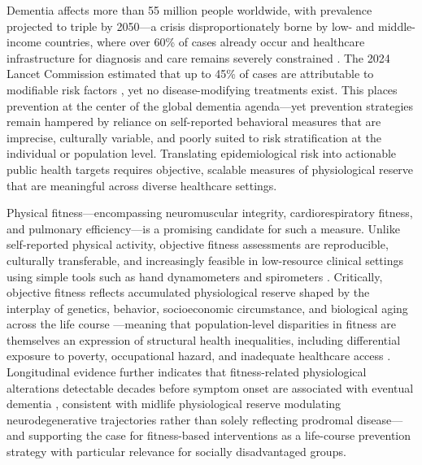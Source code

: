 \documentclass{article}
\begin{document}


Dementia affects more than 55 million people worldwide, with prevalence projected 
to triple by 2050—a crisis disproportionately borne by low- and middle-income 
countries, where over 60\% of cases already occur and healthcare infrastructure 
for diagnosis and care remains severely constrained \citep{world2021global, 
prince2015world}. The 2024 Lancet Commission estimated that up to 45\% of cases 
are attributable to modifiable risk factors \citep{livingston2024dementia}, yet no 
disease-modifying treatments exist. This places prevention at the center of the 
global dementia agenda—yet prevention strategies remain hampered by reliance on 
self-reported behavioral measures that are imprecise, culturally variable, and 
poorly suited to risk stratification at the individual or population level. 
Translating epidemiological risk into actionable public health targets requires 
objective, scalable measures of physiological reserve that are meaningful across 
diverse healthcare settings.


Physical fitness—encompassing neuromuscular integrity, cardiorespiratory fitness, 
and pulmonary efficiency—is a promising candidate for such a measure. Unlike 
self-reported physical activity, objective fitness assessments are reproducible, 
culturally transferable, and increasingly feasible in low-resource clinical 
settings using simple tools such as hand dynamometers and spirometers 
\citep{bohannon2019grip}. Critically, objective fitness 
reflects accumulated physiological reserve shaped by the interplay of genetics, 
behavior, socioeconomic circumstance, and biological aging across the life 
course \citep{edwards2018systemic, mcgreevy2023dnamfitage}—meaning that 
population-level disparities in fitness are themselves an expression of structural 
health inequalities, including differential exposure to poverty, occupational 
hazard, and inadequate healthcare access \citep{braveman2014social}. Longitudinal 
evidence further indicates that fitness-related physiological alterations 
detectable decades before symptom onset are associated with eventual dementia 
\citep{tan2017physical, gonzales2024associations}, consistent with midlife 
physiological reserve modulating neurodegenerative trajectories rather than 
solely reflecting prodromal disease—and supporting the case for fitness-based 
interventions as a life-course prevention strategy with particular relevance for 
socially disadvantaged groups.
\end{document}
